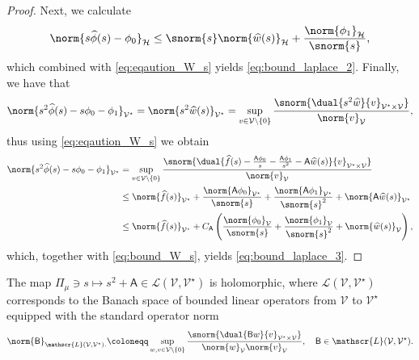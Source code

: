 \begin{proof}
Next, we calculate
\begin{equation}
	\norm{s \widehat{\phi}(s) -\phi_0}_{\mathcal{H}}
	\leq
	\snorm{s}
	\norm{\widehat{w}(s)}_{\mathcal{H}}
	+
	\frac{
		\norm{\phi_1}_\mathcal{H}
	}{
		\snorm{s}
	},
\end{equation}
which combined with \eqref{eq:eqaution_W_s} yields \eqref{eq:bound_laplace_2}. Finally, we have that 
\begin{equation}
	\norm{s^2 \widehat{\phi}(s) - s \phi_0 -\phi_1}_{\mathcal{V}^\star}
	=
	\norm{s^2 \widehat{w}(s)}_{\mathcal{V}^\star}
	=
	\sup_{v \in \mathcal{V} \backslash \{0\}}
	\frac{
		\snorm{\dual{s^2 \widehat{w}}{v}_{\mathcal{V}^\star \times \mathcal{V}}}
	}{
		\norm{v}_\mathcal{V}
	},
\end{equation}
thus using \eqref{eq:eqaution_W_s} we obtain
\begin{equation}
\begin{aligned}
	\norm{s^2 \widehat{\phi}(s) - s \phi_0 -\phi_1}_{\mathcal{V}^\star}
	&
	=
	\sup_{v \in \mathcal{V} \backslash \{0\}}
	\frac{
		\snorm{\dual{\widehat{f}(s) - \frac{ \mathsf{A} \phi_0}{s} - \frac{ \mathsf{A} \phi_1}{s^2} - \mathsf{A}\widehat{w}(s) }{v}_{\mathcal{V}^\star \times \mathcal{V}}}
	}{
		\norm{v}_\mathcal{V}
	}
	\\
	&
	\leq
	\norm{\widehat{f}(s)}_{\mathcal{V}^\star}
	+ 
	\frac{\norm{\mathsf{A} \phi_0}_{\mathcal{V}^\star}}{\snorm{s}} 
	+ 
	\frac{\norm{\mathsf{A} \phi_1}_{\mathcal{V}^\star}}{\snorm{s}^2} 
	+
	\norm{\mathsf{A}\widehat{w}(s)}_{\mathcal{V}^\star}
	\\
	&
	\leq
	\norm{ \widehat{f}(s)}_{\mathcal{V}^\star}
	+ 
	C_{\mathsf{A}}
	\left(
    		\frac{\norm{\phi_0}_{\mathcal{V}}}{\snorm{s}} 
    		+ 
    		\frac{\norm{\phi_1}_{\mathcal{V}}}{\snorm{s}^2} 
    		+
    		\norm{\widehat{w}(s)}_{\mathcal{V}}
	\right),
\end{aligned}
\end{equation}
which, together with \eqref{eq:bound_W_s}, yields \eqref{eq:bound_laplace_3}.
\end{proof}
The map $\Pi_\mu \ni s \mapsto s^2 +\mathsf{A} \in \mathscr{L}(\mathcal{V},\mathcal{V}^\star)$ is holomorphic,
where $\mathscr{L}(\mathcal{V},\mathcal{V}^\star)$ corresponds to the Banach space of bounded linear operators
from $\mathcal{V}$ to $\mathcal{V}^\star$ equipped with the standard operator norm 
\begin{equation}
	\norm{\mathsf{B}}_{\mathscr{L}(\mathcal{V},\mathcal{V}^\star).}
	\coloneqq
	\sup_{w,v \in \mathcal{V} \backslash \{0\}}
	\frac{
		\snorm{\dual{\mathsf{B}w}{v}_{\mathcal{V}^\star \times \mathcal{V}}}
	}{   
		\norm{w}_{\mathcal{V}}\norm{v}_{\mathcal{V}}
	},
	\quad
	\mathsf{B} \in \mathscr{L}(\mathcal{V},\mathcal{V}^\star).
\end{equation}	
